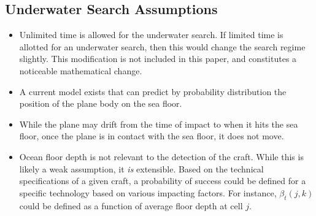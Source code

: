 \subsection{Underwater Search Assumptions}

\begin{itemize}
\item Unlimited time is allowed for the underwater search. If limited time is allotted for an underwater search, then this would change the search regime slightly. This modification is not included in this paper, and constitutes a noticeable mathematical change.
\item A current model exists that can predict by probability distribution the position of the plane body on the sea floor.
\item While the plane may drift from the time of impact to when it hits the sea floor, once the plane is in contact with the sea floor, it does not move. 
\item Ocean floor depth is not relevant to the detection of the craft. While this is likely a weak assumption, it \textit{is} extensible. Based on the technical specifications of a given craft, a probability of success could be defined for a specific technology based on various impacting factors. For instance, $\beta_t(j,k)$ could be defined as a function of average floor depth at cell $j$.
\end{itemize}